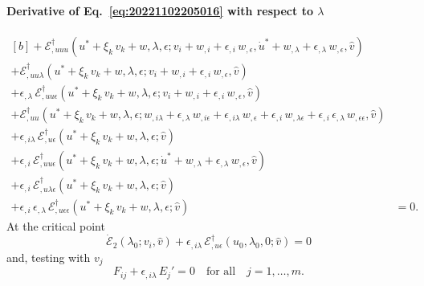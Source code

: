 \documentclass[12pt, final]{scrartcl}
\theoremstyle{definition}
\newcommand{\E}{\mathcal E}
\newcommand{\EE}{\mathcal E ^ \dagger}
\begin{document}
\paragraph{Derivative of Eq.~\eqref{eq:20221102205016} with respect to \(\lambda\)}
\begin{equation}
  \begin{aligned}[b]
    + \EE_{,uuu}(u^\ast + \xi_k \, v_k + w, \lambda, \epsilon; v_i + w_{,i} + \epsilon_{,i} \, w_{,\epsilon}, \dot{u}^\ast + w_{,\lambda} + \epsilon_{,\lambda} \, w_{,\epsilon}, \hat{v})&\\
    + \EE_{,uu\lambda}(u^\ast + \xi_k \, v_k + w, \lambda, \epsilon; v_i + w_{,i} + \epsilon_{,i} \, w_{,\epsilon}, \hat{v})&\\
    + \epsilon_{,\lambda} \, \EE_{,uu\epsilon}(u^\ast + \xi_k \, v_k + w, \lambda, \epsilon; v_i + w_{,i} + \epsilon_{,i} \, w_{,\epsilon}, \hat{v})&\\
    + \EE_{,uu}(u^\ast + \xi_k \, v_k + w, \lambda, \epsilon; w_{,i\lambda} + \epsilon_{,\lambda} \, w_{,i\epsilon} + \epsilon_{,i\lambda} \, w_{,\epsilon} + \epsilon_{,i} \, w_{,\lambda\epsilon} + \epsilon_{,i} \, \epsilon_{,\lambda} \, w_{,\epsilon\epsilon}, \hat{v}) &\\
    + \epsilon_{,i\lambda} \, \EE_{,u\epsilon}(u^\ast + \xi_k \, v_k + w, \lambda, \epsilon; \hat{v}) &\\
    + \epsilon_{,i} \, \EE_{,uu\epsilon}(u^\ast + \xi_k \, v_k + w, \lambda, \epsilon; \dot{u}^\ast + w_{,\lambda} + \epsilon_{,\lambda} \, w_{,\epsilon}, \hat{v}) &\\
    + \epsilon_{,i} \, \EE_{,u\lambda\epsilon}(u^\ast + \xi_k \, v_k + w, \lambda, \epsilon; \hat{v}) &\\
    + \epsilon_{,i} \, \epsilon_{,\lambda} \, \EE_{,u\epsilon\epsilon}(u^\ast + \xi_k \, v_k + w, \lambda, \epsilon; \hat{v}) &= 0.
  \end{aligned}
\end{equation}
At the critical point
\begin{equation}
  \dot{\E}_2(\lambda_0; v_i, \hat{v}) + \epsilon_{,i\lambda} \, \EE_{,u\epsilon}(u_0, \lambda_0, 0; \hat{v}) = 0
\end{equation}
and, testing with \(v_j\)
\begin{equation}
  F_{ij} + \epsilon_{,i\lambda} \, E_j' = 0 \quad \text{for all} \quad j = 1, \ldots, m.
\end{equation}
\end{document}
